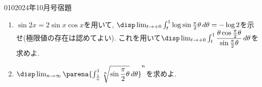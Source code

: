 \begin{prob}{010}{}{2024年10月号宿題}
\begin{enumerate}
\item $\sin{2x} = 2\sin{x}\cos{x}$を用いて, $\disp\lim_{t\to +0}\int_{t}^{1} \log{\sin{\frac{\pi}{2}\theta}}\, d\theta = -\log{2}$を示せ(極限値の存在は認めてよい). これを用いて$\disp\lim_{t\to + 0}\int_{t}^{1} \dfrac{\theta\cos{\frac{\pi}{2}\theta}}{\sin{\frac{\pi}{2}\theta}} \, d\theta$を求めよ.
\item $\disp\lim_{n\to \infty} \parena{\int_{\frac{1}{n}}^{1} \sqrt[n]{\sin{\dfrac{\pi}{2}\theta}} \, d\theta}^{n}
$を求めよ.
\end{enumerate}
\end{prob}
